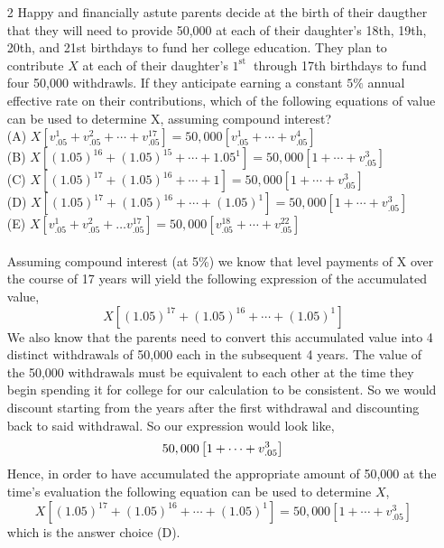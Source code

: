 \documentclass[10pt]{article}
\begin{document}
\begin{enumerate}
\pagebreak

  \item [2] Happy and financially astute parents decide at the birth of their daugther that they will need to provide 50,000 at each of their daughter's 18th, 19th, 20th, and 21st birthdays to fund her college education. They plan to contribute $X$ at each of their daughter's $1^{\text {st }}$ through 17th birthdays to fund four 50,000 withdrawls. If they anticipate earning a constant $5 \%$ annual effective rate on their contributions, which of the following equations of value can be used to determine X, assuming compound interest?\\

(A) $X\left[v_{.05}^{1}+v_{.05}^{2}+\cdots+v_{.05}^{17}\right]=50,000\left[v_{.05}^{1}+\cdots+v_{.05}^{4}\right]$\\
(B) $X\left[(1.05)^{16}+(1.05)^{15}+\cdots+1.05^{1}\right]=50,000\left[1+\cdots+v_{.05}^{3}\right]$\\
(C) $X\left[(1.05)^{17}+(1.05)^{16}+\cdots+1\right]=50,000\left[1+\cdots+v_{.05}^{3}\right]$\\
(D) $X\left[(1.05)^{17}+(1.05)^{16}+\cdots+(1.05)^{1}\right]=50,000\left[1+\cdots+v_{.05}^{3}\right]$\\
(E) $X\left[v_{.05}^{1}+v_{.05}^{2}+\ldots v_{.05}^{17}\right]=50,000\left[v_{.05}^{18}+\cdots+v_{.05}^{22}\right]$\\

\\

Assuming compound interest (at 5\%) we know that level payments of X over the course of 17 years will yield the
following expression of the accumulated value,
$$
X\left[(1.05)^{17}+(1.05)^{16}+\cdots+(1.05)^{1}\right]
$$
We also know that the parents need to convert this accumulated value into 4 distinct withdrawals
of 50,000 each in the subsequent 4 years. The value of the 50,000 withdrawals must be equivalent
to each other at the time they begin spending it for college for our calculation to be consistent.
So we would discount starting from the years after the first withdrawal and discounting back to said
withdrawal. So our expression would look like,
$$
50,000\left[1+\cdots+v_{.05}^{3}\right]\\
$$
Hence, in order to have accumulated the appropriate amount of 50,000 at the time's evaluation the following
equation can be used to determine $X$,
$$
X\left[(1.05)^{17}+(1.05)^{16}+\cdots+(1.05)^{1}\right]=50,000\left[1+\cdots+v_{.05}^{3}\right]
$$
which is the answer choice (D).


\end{enumerate}
\end{document}
